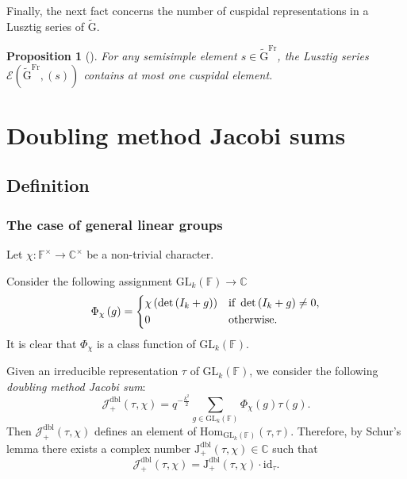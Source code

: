 \documentclass[12pt, reqno]{amsart}
\newtheorem{proposition}[theorem]{Proposition}
\theoremstyle{definition}
\theoremstyle{definition}
\theoremstyle{definition}
\newcommand{\cComplex}{\mathbb{C}}
\newcommand{\multiplicativegroup}[1]{#1^{\times}}
\newcommand{\Hom}{\mathrm{Hom}}
\newcommand{\idmap}{\mathrm{id}}
\newcommand{\IdentityMatrix}[1]{I_{#1}}
\newcommand{\GL}{\mathrm{GL}}
\newcommand{\GroupExtension}[1]{\widetilde{#1}}
\newcommand{\finiteField}{\mathbb{F}}
\newcommand{\Frobenius}{\operatorname{Fr}}
\newcommand{\posDblJacobiSum}[2]{\mathcal{J}_{+}^{\mathrm{dbl}}\left(#1, #2\right)}
\newcommand{\posDblJacobiSumScalar}[2]{\mathrm{J}_{+}^{\mathrm{dbl}}\left(#1, #2\right)}
\newcommand{\algebraicGroup}[1]{\boldsymbol{\mathrm{#1}}}
\newcommand{\LusztigSeries}[2]{\mathcal{E}\left(#1, (#2)\right)}
\newcommand{\FrobeniusFixedPoints}[2][\Frobenius]{\algebraicGroup{#2}^{#1}}
\begin{document}
Finally, the next fact concerns the number of cuspidal representations in a Lusztig series of $\GroupExtension{\algebraicGroup{G}}$.

\begin{proposition}[{\cite[Page 172]{Lusztig1977}}]\label{prop:at-most-one-cuspidal-lusztig-series}
	For any semisimple element $s \in \FrobeniusFixedPoints{\GroupExtension{G}}$, the Lusztig series $\LusztigSeries{\FrobeniusFixedPoints{\GroupExtension{G}}}{s}$ contains at most one cuspidal element.
\end{proposition}

\section{Doubling method Jacobi sums}

\subsection{Definition}

\subsubsection{The case of general linear groups}

Let $\chi \colon \multiplicativegroup{\finiteField} \to \multiplicativegroup{\cComplex}$ be a non-trivial character.

Consider the following assignment $\GL_k\left(\finiteField\right) \to \cComplex$
$$\Phi_{\chi}\left(g\right) = \begin{dcases}
	\chi\left(\det\left(\IdentityMatrix{k}+g\right)\right) & \text{if }\det\left(\IdentityMatrix{k}+g\right) \ne 0,\\
	0 & \text{otherwise.}
\end{dcases}$$
It is clear that $\Phi_{\chi}$ is a class function of $\GL_k\left(\finiteField\right)$.

Given an irreducible representation $\tau$ of $\GL_k\left(\finiteField\right)$, we consider the following \emph{doubling method Jacobi sum}:
$$\posDblJacobiSum{\tau}{\chi} = q^{-\frac{k^2}{2}} \sum_{g \in \GL_k\left(\finiteField\right)} \Phi_{\chi}\left(g\right) \tau\left(g\right).$$
Then $\posDblJacobiSum{\tau}{\chi}$ defines an element of $\Hom_{\GL_k\left(\finiteField\right)}\left(\tau, \tau\right)$. Therefore, by Schur's lemma there exists a complex number $\posDblJacobiSumScalar{\tau}{\chi} \in \cComplex$ such that $$\posDblJacobiSum{\tau}{\chi} = \posDblJacobiSumScalar{\tau}{\chi} \cdot \idmap_\tau.$$ 
\end{document}
